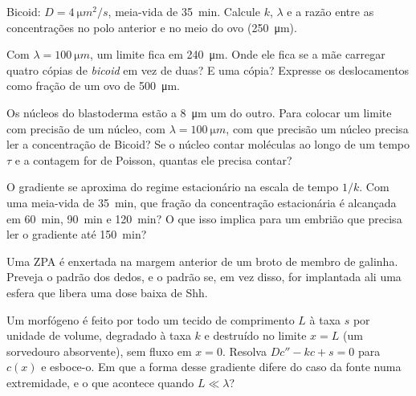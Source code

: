 \begin{exercise}[$\star\star$]\label{exo:b3:developmental-genetics:5}
Bicoid: $D = \qty{4}{\micro m^2/s}$, meia-vida de \qty{35}{min}. Calcule
$k$, $\lambda$ e a razão entre as concentrações no polo anterior e no
meio do ovo (\qty{250}{\micro m}).
\end{exercise}

\begin{exercise}[$\star\star$]\label{exo:b3:developmental-genetics:6}
Com $\lambda = \qty{100}{\micro m}$, um limite fica em
\qty{240}{\micro m}. Onde ele fica se a mãe carregar quatro cópias de
\emph{bicoid} em vez de duas? E uma cópia? Expresse os deslocamentos
como fração de um ovo de \qty{500}{\micro m}.
\end{exercise}

\begin{exercise}[$\star\star$]\label{exo:b3:developmental-genetics:7}
Os núcleos do blastoderma estão a \qty{8}{\micro m} um do outro. Para
colocar um limite com precisão de um núcleo, com $\lambda = \qty{100}{\micro m}$, com que precisão um núcleo precisa ler a
concentração de Bicoid? Se o núcleo contar moléculas ao longo de um
tempo $\tau$ e a contagem for de Poisson, quantas ele precisa contar?
\end{exercise}

\begin{exercise}[$\star\star$]\label{exo:b3:developmental-genetics:8}
O gradiente se aproxima do regime estacionário na escala de tempo $1/k$.
Com uma meia-vida de \qty{35}{min}, que fração da concentração
estacionária é alcançada em \qty{60}{min}, \qty{90}{min} e
\qty{120}{min}? O que isso implica para um embrião que precisa ler o
gradiente até \qty{150}{min}?
\end{exercise}

\begin{exercise}[$\star\star$]\label{exo:b3:developmental-genetics:9}
Uma ZPA é enxertada na margem anterior de um broto de membro de galinha.
Preveja o padrão dos dedos, e o padrão se, em vez disso, for implantada
ali uma esfera que libera uma dose baixa de Shh.
\end{exercise}

\begin{exercise}[$\star\star\star$]\label{exo:b3:developmental-genetics:10}
Um morfógeno é feito por todo um tecido de comprimento $L$ à taxa $s$ por
unidade de volume, degradado à taxa $k$ e destruído no limite $x =
L$ (um
sorvedouro absorvente), sem fluxo em $x = 0$. Resolva $Dc'' - kc + s =
0$
para $c(x)$ e esboce-o. Em que a forma desse gradiente difere do caso da
fonte numa extremidade, e o que acontece quando $L \ll \lambda$?
\end{exercise}

